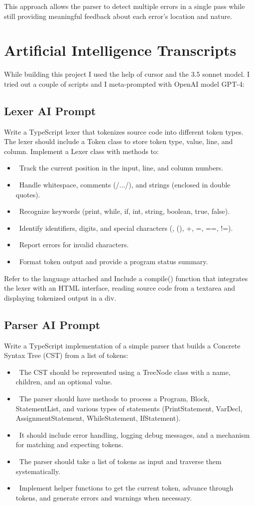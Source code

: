 \documentclass[12pt]{article}
\begin{document}
This approach allows the parser to detect multiple errors in a single pass while still providing meaningful feedback about each error's location and nature.

\section{Artificial Intelligence Transcripts}
While building this project I used the help of cursor and the 3.5 sonnet model. I tried out a couple of scripts and I meta-prompted with OpenAI model GPT-4: 
\subsection{Lexer AI Prompt}
Write a TypeScript lexer that tokenizes source code into different token types. The lexer should include a Token class to store token type, value, line, and column. Implement a Lexer class with methods to: 
\begin{itemize}
    \item \ Track the current position in the input, line, and column numbers.
    \item \ Handle whitespace, comments (/.../), and strings (enclosed in double quotes).
    \item \ Recognize keywords (print, while, if, int, string, boolean, true, false).
    \item \ Identify identifiers, digits, and special characters ({}, (), +, =, ==, !=).
    \item \ Report errors for invalid characters.
    \item \ Format token output and provide a program status summary.
\end{itemize}
Refer to the language attached and Include a compile() function that integrates the lexer with an HTML interface, reading source code from a textarea and displaying tokenized output in a div.

\subsection{Parser AI Prompt}
Write a TypeScript implementation of a simple parser that builds a Concrete Syntax Tree (CST) from a list of tokens: 
\begin{itemize}
    \item \ The CST should be represented using a TreeNode class with a name, children, and an optional value.
    \item \ The parser should have methods to process a Program, Block, StatementList, and various types of statements (PrintStatement, VarDecl, AssignmentStatement, WhileStatement, IfStatement).
    \item \ It should include error handling, logging debug messages, and a mechanism for matching and expecting tokens.
    \item \ The parser should take a list of tokens as input and traverse them systematically.
    \item \ Implement helper functions to get the current token, advance through tokens, and generate errors and warnings when necessary.
\end{itemize}
\end{document}
